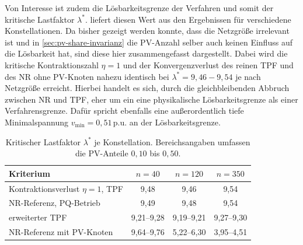 Von Interesse ist zudem die Lösbarkeitsgrenze der Verfahren und somit der kritische Lastfaktor $\lambda^*$.
 liefert diesen Wert aus den Ergebnissen für verschiedene Konstellationen.
Da bisher gezeigt werden konnte, dass die Netzgröße irrelevant ist und in \cref{sec:pv-share-invarianz} die PV-Anzahl selber auch keinen Einfluss auf die Lösbarkeit hat, sind diese hier zusammengefasst dargestellt.
Dabei wird die kritische Kontraktionszahl $\eta=1$ und der Konvergenzverlust des reinen TPF und des NR ohne PV-Knoten  nahezu identisch bei $\lambda^*=9,46-9,54$ je nach Netzgröße erreicht.
Hierbei handelt es sich, durch die gleichbleibenden Abbruch zwischen NR und TPF, eher um ein eine physikalische Lösbarkeitsgrenze als einer Verfahrensgrenze.
Dafür spricht ebenfalls eine außerordentlich tiefe Minimalspannung $v_\mathrm{min}=0,51$\,p.u. an der Lösbarkeitsgrenze.\\





\begin{table}[htbp]
	\centering
	\small
	\caption{Kritischer Lastfaktor $\lambda^\ast$ je Konstellation. Bereichsangaben
		umfassen die PV-Anteile $0{,}10$ bis $0{,}50$.}
	\label{tab:lam-lambdastar}
	\begin{tabular}{l|c|c|c}
		\toprule
		Kriterium & $n=40$ & $n=120$ & $n=350$ \\
		\midrule
		
		Kontraktionsverlust $\eta=1$, TPF & 9,48 & 9,46 & 9,54 \\
		NR-Referenz, PQ-Betrieb & 9,49 & 9,48 & 9,54 \\
		\midrule
		erweiterter TPF & 9,21--9,28 & 9,19--9,21 & 9,27--9,30 \\
		NR-Referenz mit PV-Knoten & 9,64--9,76 & 5,22--6,30 & 3,95--4,51 \\
		\bottomrule
	\end{tabular}
\end{table}


